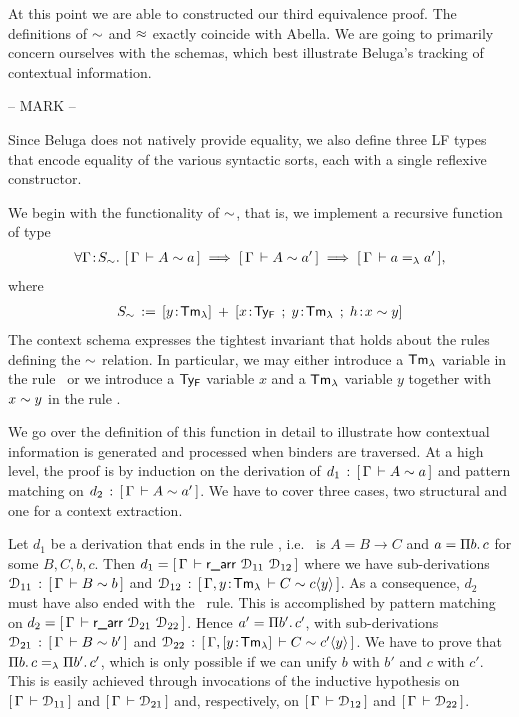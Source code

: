 At this point we are able to constructed our third equivalence proof.
The definitions of $\mathrel{\sim}$ and $\mathrel{\approx}$ exactly coincide with Abella.
We are going to primarily concern ourselves with the schemas, which best illustrate Beluga's tracking of contextual information.

{\color{red} -- MARK --}

Since Beluga does not natively provide equality, we also define three LF types that encode equality of the various syntactic sorts, each with a single reflexive constructor.

We begin with the functionality of $\mathrel{\sim}$, that is, we implement a recursive function of type
\begin{align*}
  \forall \Gamma \!:\! S_{\mathrel{\sim}}.\,\, [\,\Gamma\,\vdash A \mathrel{\sim} a\,] \implies [\,\Gamma\,\vdash A \mathrel{\sim} a'\,] \implies [\,\Gamma\,\vdash a =_{\lambda} a'\,],
\end{align*}
where
\begin{align*}
  S_{\tyr} \eqdef [y \of \TmL] \mrel{+} [x\of\TyF \mrel{;} y\of\TmL \mrel{;} h\of x \tyr y]
\end{align*}
The context schema expresses the tightest invariant that holds about the rules defining the $\mathrel{\sim}$ relation.%
In particular, we may either introduce a $\mathsf{Tm_{\lambda}}$ variable in the rule \rarr~or we introduce a $\mathsf{Ty_{F}}$ variable $x$ and a $\mathsf{Tm_{\lambda}}$ variable $y$ together with $x \mathrel{\sim} y$ in the rule \rall.

We go over the definition of this function in detail to illustrate how contextual information is generated and processed when binders are traversed.
At a high level, the proof is by induction on the derivation of $d_1 \mathrel{\, : \,} [\,\Gamma\,\vdash A \mathrel{\sim} a\,]$ and pattern matching on $d_2 \mathrel{\, : \,} [\,\Gamma\,\vdash A \mathrel{\sim} a'\,]$.
We have to cover three cases, two structural and one for a context extraction.

Let $d_1$ be a derivation that ends in the rule \rarr, i.e.~ is $A = B \to C$ and $a = \Pi b.\,c$ for some $B,C,b,c$. Then $d_1 = [\,\Gamma\,\vdash \textsf{r\_arr}~\mathcal{D}_{11}~\mathcal{D}_{12}\,]$ where
we have sub-derivations $\mathcal{D}_{11} \mathrel{\, : \,} [\,\Gamma\,\vdash B \mathrel{\sim} b\,]$ and $\mathcal{D}_{12} \mathrel{\, : \,} [\,\Gamma, y \!:\! \mathsf{Tm_{\lambda}}\,\vdash C \mathrel{\sim} c\langle y\rangle\,]$.
As a consequence, $d_2$ must have also ended with the \rarr~rule. This is accomplished by pattern matching on $d_2 = [\,\Gamma\,\vdash \textsf{r\_arr}~\mathcal{D}_{21}~\mathcal{D}_{22}\,]$. Hence $a' = \Pi b'.\,c'$, with sub-derivations $\mathcal{D}_{21} \mathrel{\, : \,} [\,\Gamma\,\vdash B \mathrel{\sim} b'\,]$ and $\mathcal{D}_{22} \mathrel{\, : \,} [\,\Gamma, [y \!:\! \mathsf{Tm_{\lambda}}]\,\vdash C \mathrel{\sim} c'\langle y\rangle\,]$.
We have to prove that $\Pi b.\,c =_{\lambda} \Pi b'.\,c'$, which is only possible if we can unify $b$ with $b'$ and $c$ with $c'$.
This is easily achieved through invocations of the inductive hypothesis on $[\,\Gamma\,\vdash \mathcal{D}_{11}\,]$ and $[\,\Gamma\,\vdash \mathcal{D}_{21}\,]$ and, respectively, on $[\,\Gamma\,\vdash \mathcal{D}_{12}\,]$ and $[\,\Gamma\,\vdash \mathcal{D}_{22}\,]$.


